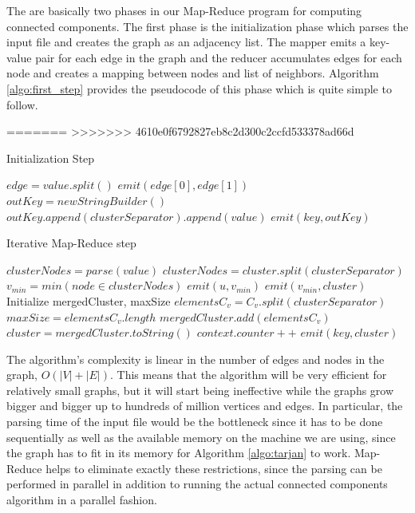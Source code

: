 The are basically two phases in our Map-Reduce program for computing connected components. The first phase is the initialization phase which parses the input file and creates the graph as an adjacency list. The mapper emits a key-value pair for each edge in the graph and the reducer accumulates edges for each node and creates a mapping between nodes and list of neighbors. Algorithm \ref{algo:first_step} provides the pseudocode of this phase which is quite simple to follow.

=======
>>>>>>> 4610e0f6792827eb8c2d300c2ccfd533378ad66d
\begin{algorithm}[!h]
	\caption{Initialization Step}
	\label{algo:first_step}
	\begin{algorithmic}[1]
			\State $edge = value.split() $
			\State $emit(edge[0], edge[1])$
		\EndFunction
			\State $outKey = new StringBuilder()$
				\State $outKey.append(clusterSeparator).append(value)$
			\EndFor
			\State $emit(key, outKey)$
		\EndFunction
	\end{algorithmic}
\end{algorithm}

\begin{algorithm}[!h]
	\caption{Iterative Map-Reduce step}
	\label{algo:second_step}
	\begin{algorithmic}[1]
			\State $clusterNodes = parse(value)$
			\State $clusterNodes = cluster.split(clusterSeparator)$
			\State $v_{min} = min(node \in clusterNodes)$
				\State $emit(u, v_{min})$
			\EndFor
			\State $emit(v_{min}, cluster)$
		\EndFunction
			\State Initialize mergedCluster, maxSize
				\State $elementsC_v = C_v.split(clusterSeparator)$
					\State $maxSize = elementsC_v.length$ 
				\EndIf
				\State $mergedCluster.add(elementsC_v)$
			\EndFor
			\State $cluster = mergedCluster.toString()$
				\State $context.counter++$
			\EndIf
			\State $emit(key, cluster)$
		\EndFunction
	\end{algorithmic}
\end{algorithm}

The algorithm's complexity is linear in the number of edges and nodes in the graph, \ie $O(|V| + |E|)$. This means that the algorithm will be very efficient for relatively small graphs, but it will start being ineffective while the graphs grow bigger and bigger up to hundreds of million vertices and edges. In particular, the parsing time of the input file would be the bottleneck since it has to be done sequentially as well as the available memory on the machine we are using, since the graph has to fit in its memory for Algorithm \ref{algo:tarjan} to work. Map-Reduce helps to eliminate exactly these restrictions, since the parsing can be performed in parallel in addition to running the actual connected components algorithm in a parallel fashion.

